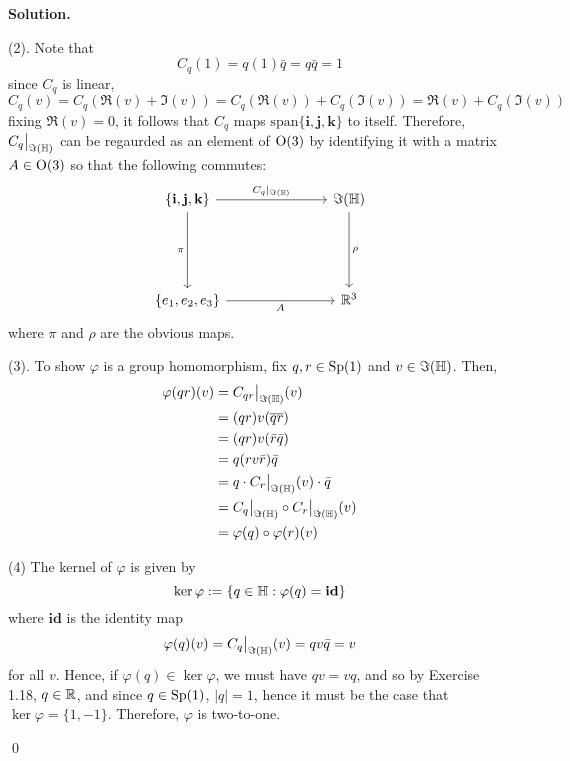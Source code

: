 \documentclass[12pt]{book}
\theoremstyle{definition}
\newenvironment{solution}
{%
  \par\noindent\textbf{Solution.}\quad
}
{%
  \qed\par
}
\begin{document}
\begin{solution}
  (2). Note that
  \[
    C_q(1) = q(1)\bar{q} = q\bar{q} = 1
  \]  
  since $C_q$ is linear,
  \[
    C_q(v) = C_q(\Re(v) + \Im(v)) = C_q(\Re(v)) + C_q(\Im(v)) = \Re(v) + C_q(\Im(v))
  \]
  fixing $\Re(v) = 0$, it follows that $C_q$ maps $\text{span}\{\mathbf{i}, \mathbf{j}, \mathbf{k}\}$ to itself.
  Therefore, $C_q \big|_{\Im(\mathbb{H})}$ can be regaurded as an element of $\mathrm{O}(3)$ by identifying it with a matrix $A \in \mathrm{O}(3)$ so that the following commutes:
  \[\begin{tikzcd}
    {\{\mathbf{i}, \mathbf{j}, \mathbf{k}\}} &&& \Im(\HH) \\
    \\
    \\
    {\{e_1, e_2, e_3\}} &&& {\R^3}
    \arrow["{C_q |_{\Im(\HH)}}", from=1-1, to=1-4]
    \arrow["\pi"', from=1-1, to=4-1]
    \arrow["{A}"', from=4-1, to=4-4]
    \arrow["\rho", from=1-4, to=4-4]
  \end{tikzcd}\]
  where $\pi$ and $\rho$ are the obvious maps.

  (3). To show $\varphi$ is a group homomorphism, fix $q, r \in \mathrm{Sp}(1)$ and $v \in \Im(\mathbb{H})$.
  Then,
  \[
  \begin{aligned}
    \varphi(qr)(v) &= C_{qr} \big|_{\Im(\mathbb{H})}(v) \\
                   &= (qr)v(\overline{qr}) \\
                   &= (qr)v(\bar{r} \bar{q}) \\
                   &= q(rv\bar{r})\bar{q} \\
                   &= q \cdot C_{r} \big|_{\Im(\mathbb{H})}(v) \cdot \bar{q} \\
                   &= C_{q} \big|_{\Im(\mathbb{H})} \circ C_{r} \big|_{\Im(\mathbb{H})}(v) \\
                   &= \varphi(q) \circ \varphi(r) (v)
  \end{aligned}
  \]

  (4) The kernel of $\varphi$ is given by
  \[
  \ker{\varphi} := \{q \in \mathbb{H} : \varphi(q) = \textbf{id}\}
  \]
  where $\textbf{id}$ is the identity map 
  \[\varphi(q)(v) = C_{q} \big|_{\Im(\mathbb{H})}(v) = qv\bar{q} = v\]
  for all $v$.
  Hence, if $\varphi(q) \in \ker{\varphi}$, we must have $qv = vq$, and so by Exercise 1.18, $q \in \mathbb{R}$, and since $q \in \mathrm{Sp}(1)$, $|q| = 1$, hence it must be the case that $\ker{\varphi} = \{1, -1\}$.
  Therefore, $\varphi$ is two-to-one.

\end{solution}
\end{document}
